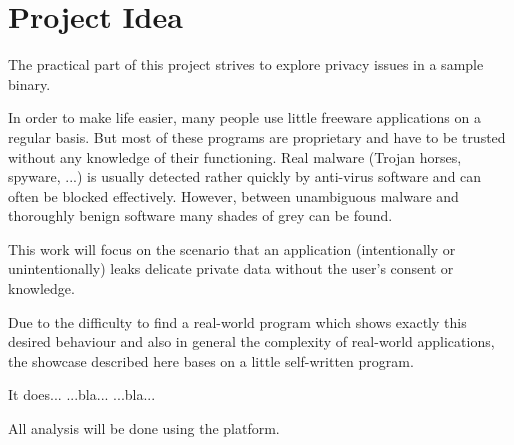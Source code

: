 \section{Project Idea}\label{sec:proj}

The practical part of this project strives to explore privacy issues in a sample binary.

In order to make life easier, many people use little freeware applications on a regular basis.
But most of these programs are proprietary and have to be trusted without any knowledge of their functioning.
Real malware (Trojan horses, spyware, ...) is usually detected rather quickly by anti-virus software and can often be blocked effectively.
However, between unambiguous malware and thoroughly benign software many shades of grey can be found.

This work will focus on the scenario that an application (intentionally or unintentionally) leaks delicate private data without the user's consent or knowledge.


Due to the difficulty to find a real-world program which shows exactly this desired behaviour and also in general the complexity of real-world applications, the showcase described here bases on a little self-written program.

It does...
...bla...
...bla...


All analysis will be done using the \sse platform.

\iffalse
§4	Project idea: explore privacy issues in a sample binary
		> Plan darlegen: Programme könnten unerwünscht Infos preisgeben.
		> Daher: Eigenes kleines Programm, das … macht.
\fi